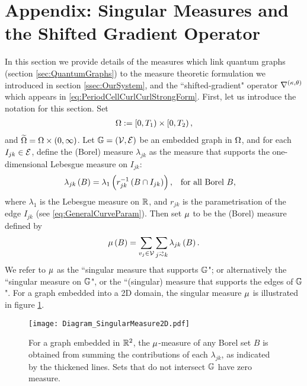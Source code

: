 \section{Appendix: Singular Measures and the Shifted Gradient Operator} \label{app:SMandSGO}
In this section we provide details of the measures which link quantum graphs (section \ref{sec:QuantumGraphs}) to the measure theoretic formulation we introduced in section \ref{ssec:OurSystem}, and the ``shifted-gradient" operator $\nabla^{\left( \kappa, \theta \right)}$ which appears in \eqref{eq:PeriodCellCurlCurlStrongForm}.
First, let us introduce the notation for this section.
Set 
\begin{align*}
	\Omega:= \left[0,T_1\right)\times\left[0,T_2\right), 
\end{align*}
and $\widetilde{\Omega} = \Omega \times \left( 0,\infty \right)$.
Let $\mathbb{G} = \left( \mathcal{V},\mathcal{E} \right)$ be an embedded graph in $\Omega$, and for each $I_{jk}\in \mathcal{E}$, define the (Borel) measure $\lambda_{jk}$ as the measure that supports the one-dimensional Lebesgue measure on $I_{jk}$:
\begin{align*}
	\lambda_{jk}\left( B \right) = \lambda_{1}\left( r_{jk}^{-1}\left( B \cap I_{jk} \right) \right),
	&\quad\text{for all Borel } B,
\end{align*}
where $\lambda_1$ is the Lebesgue measure on $\mathbb{R}$, and $r_{jk}$ is the parametrisation of the edge $I_{jk}$ (see \eqref{eq:GeneralCurveParam}).
Then set $\mu$ to be the (Borel) measure defined by
\begin{align*}
	\ddmes\bracs{B} = \sum_{v_j\in \vertSet}\sum_{j\conLeft k} \lambda_{jk}\bracs{B}.
\end{align*}
We refer to $\mu$ as the ``singular measure that supports $\mathbb{G}$"; or alternatively the ``singular measure on $\mathbb{G}$", or the ``(singular) measure that supports the edges of $\mathbb{G}$".
For a graph embedded into a 2D domain, the singular measure $\mu$ is illustrated in figure \ref{fig:Diagram_SingularMeasure2D}.
\begin{figure}[b!]
	\centering
	\texttt{[image: Diagram\_SingularMeasure2D.pdf]}
	\caption{\label{fig:Diagram_SingularMeasure2D} For a graph embedded in $\mathbb{R}^2$, the $\mu$-measure of any Borel set $B$ is obtained from summing the contributions of each $\lambda_{jk}$, as indicated by the thickened lines.
	Sets that do not intersect $\mathbb{G}$ have zero measure.}
\end{figure}

